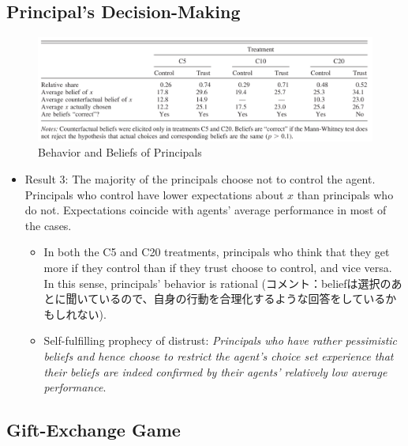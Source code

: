 \documentclass[../root]{subfiles}
\begin{document}
    \subsection{Principal's Decision-Making}

    \begin{figure}[h]
        \centering
        \includegraphics[width = 16cm]{0515kato/result3.png}
        \caption{Behavior and Beliefs of Principals}
        \label{result3}
    \end{figure}

    \begin{itemize}
        \item Result 3: The majority of the principals choose not to control the agent. Principals who control have lower expectations about $x$ than principals who do not. Expectations coincide with agents' average performance in most of the cases.
        \begin{itemize}
            \item In both the C5 and C20 treatments, principals who think that they get more if they control than if they trust choose to control, and vice versa. In this sense, principals' behavior is rational (コメント：beliefは選択のあとに聞いているので、自身の行動を合理化するような回答をしているかもしれない).
            \item Self-fulfilling prophecy of distrust: \textit{Principals who have rather pessimistic beliefs and hence choose to restrict the agent's choice set experience that their beliefs are indeed confirmed by their agents' relatively low average performance}.
        \end{itemize}
    \end{itemize}

    \subsection{Gift-Exchange Game}
\end{document}
